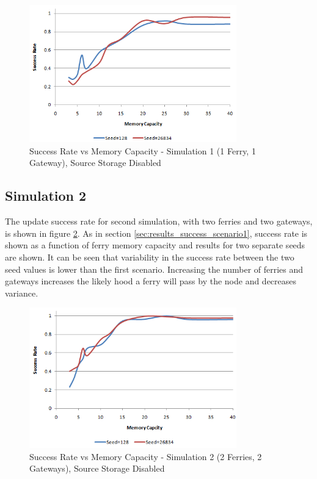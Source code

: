 \begin{figure}[htbp]
    \begin{center}
    \includegraphics[width=0.8\textwidth]{images/result_sccess_sim1byseed_dss}
    \caption{Success Rate vs Memory Capacity - Simulation 1 (1 Ferry, 1 Gateway), Source Storage Disabled}
    \label{fig:result_sccess_sim1byseed_dss}
    \end{center}
\end{figure}

\subsection{Simulation 2}
\label{sec:results_success_s2}

The update success rate for second simulation, with two ferries and two gateways, is shown in figure \ref{fig:result_sccess_sim2byseed_dss}.
As in section \ref{sec:results_success_scenario1}, success rate is shown as a function of ferry memory capacity and results for two separate seeds are shown.
It can be seen that variability in the success rate between the two seed values is lower than the first scenario.
Increasing the number of ferries and gateways increases the likely hood a ferry will pass by the node and decreases variance.

\begin{figure}[htbp]
    \centering
    \includegraphics[width=0.8\textwidth]{images/result_sccess_sim2byseed_dss}
    \caption{Success Rate vs Memory Capacity - Simulation 2 (2 Ferries, 2 Gateways), Source Storage Disabled}
    \label{fig:result_sccess_sim2byseed_dss}
\end{figure}

